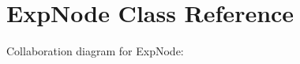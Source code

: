\hypertarget{classExpNode}{}\section{Exp\+Node Class Reference}
\label{classExpNode}


Collaboration diagram for Exp\+Node\+:
